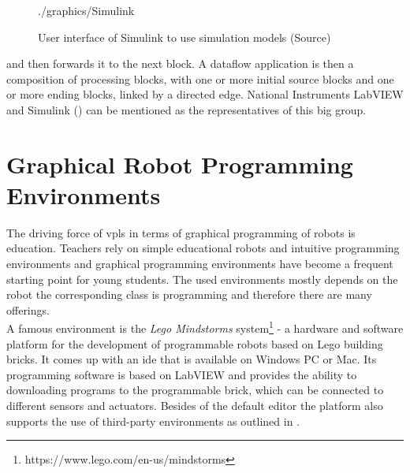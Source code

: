 \begin{figure}[!h]
	\centering
	\begin{overpic}[width=0.65\linewidth]{./graphics/Simulink}
	\end{overpic}
    \caption[User interface of Simulink to use simulation models]%
    {User interface of Simulink to use simulation models (Source\footnotemark)}
	\label{fig:Simulink}%
\end{figure}

and then forwards it to the next block. A dataflow application is then a composition of processing blocks, with one or more initial source blocks and one or more ending blocks, linked by a directed edge.\cite{Sousa2012DataflowPC} National Instruments LabVIEW \cite{LabView} and Simulink () can be mentioned as the representatives of this big group.

\section{Graphical Robot Programming Environments} \label{sec:GraphicalEnvs}
The driving force of \glspl{vpl} in terms of graphical programming of robots is education. Teachers rely on simple educational robots and intuitive programming environments and graphical programming environments have become a frequent starting point for young students. The used environments mostly depends on the robot the corresponding class is programming and therefore there are many offerings. \\

A famous environment is the \textit{Lego Mindstorms} system\footnote{https://www.lego.com/en-us/mindstorms} - a hardware and software platform for the development of programmable robots based on Lego building bricks. It comes up with an \gls{ide} that is available on Windows PC or Mac. Its programming software is based on LabVIEW and provides the ability to downloading programs to the programmable brick, which can be connected to different sensors and actuators. Besides of the default editor the platform also supports the use of third-party environments as outlined in \cite{Hirst2003}. \\

